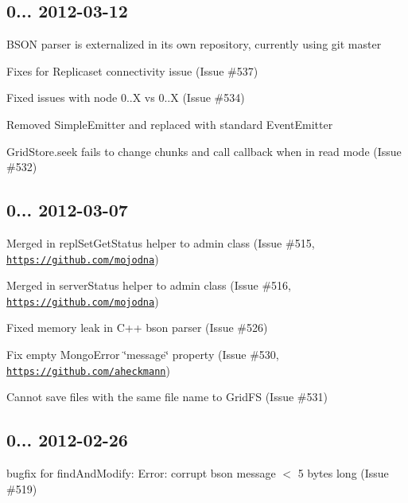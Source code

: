 \subsection*{0... 2012-\/03-\/12 }


\begin{DoxyItemize}
\item B\+S\+ON parser is externalized in it\textquotesingle{}s own repository, currently using git master
\item Fixes for Replicaset connectivity issue (Issue \#537)
\item Fixed issues with node 0..\+X vs 0..\+X (Issue \#534)
\item Removed Simple\+Emitter and replaced with standard Event\+Emitter
\item Grid\+Store.\+seek fails to change chunks and call callback when in read mode (Issue \#532)
\end{DoxyItemize}

\subsection*{0... 2012-\/03-\/07 }


\begin{DoxyItemize}
\item Merged in repl\+Set\+Get\+Status helper to admin class (Issue \#515, \href{https://github.com/mojodna}{\tt https\+://github.\+com/mojodna})
\item Merged in server\+Status helper to admin class (Issue \#516, \href{https://github.com/mojodna}{\tt https\+://github.\+com/mojodna})
\item Fixed memory leak in C++ bson parser (Issue \#526)
\item Fix empty Mongo\+Error \char`\"{}message\char`\"{} property (Issue \#530, \href{https://github.com/aheckmann}{\tt https\+://github.\+com/aheckmann})
\item Cannot save files with the same file name to Grid\+FS (Issue \#531)
\end{DoxyItemize}

\subsection*{0... 2012-\/02-\/26 }


\begin{DoxyItemize}
\item bugfix for find\+And\+Modify\+: Error\+: corrupt bson message $<$ 5 bytes long (Issue \#519)
\end{DoxyItemize}

